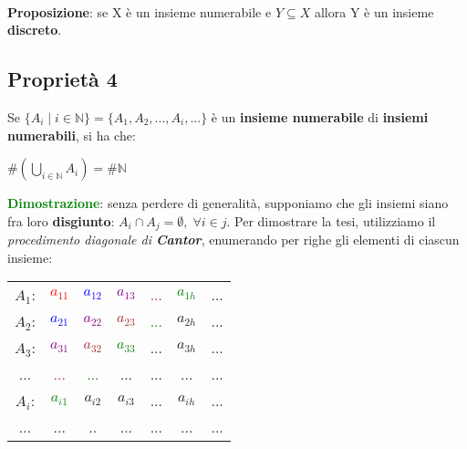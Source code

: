 \\ \newline
\textbf{Proposizione}: se X è un insieme numerabile e $Y \subseteq X$ allora Y è un insieme \textbf{discreto}.

\newpage
\subsection{Proprietà 4}
Se $\{A_i \; | \; i \in \mathbb{N}\} = \{A_1, A_2, ..., A_i, ...\}$ è un \textbf{insieme numerabile} di \textbf{insiemi numerabili}, si ha che:
\begin{center}
    $\#(\bigcup_{i \in \mathbb{N}}A_i) = \#\mathbb{N}$
\end{center}
\textcolor{green}{\textbf{Dimostrazione}}: senza perdere di generalità, supponiamo che gli insiemi siano fra loro \textbf{disgiunto}: $A_i \cap A_j = \emptyset, \; \forall i \in j$. Per dimostrare la tesi, utilizziamo il \textit{procedimento diagonale di \textbf{Cantor}}, enumerando per righe gli elementi di ciascun insieme:

\begin{center}
    \begin{tabular}{ccccccc}
        $A_1$: & \textcolor{red}{$a_{11}$} & \textcolor{blue}{$a_{12}$} & \textcolor{purple}{$a_{13}$} & \textcolor{brown}{...} & \textcolor{green}{$a_{1h}$} & ... \\
        $A_2$: & \textcolor{blue}{$a_{21}$} & \textcolor{purple}{$a_{22}$} & \textcolor{brown}{$a_{23}$} & \textcolor{green}{...} & $a_{2h}$ & ... \\
        $A_3$: & \textcolor{purple}{$a_{31}$} & \textcolor{brown}{$a_{32}$} & \textcolor{green}{$a_{33}$} & ... & $a_{3h}$ & ... \\
        ... & \textcolor{brown}{...} & \textcolor{green}{...} & ... & ... & ... & ... \\
        $A_i$: & \textcolor{green}{$a_{i1}$} & $a_{i2}$ & $a_{i3}$ & ... & $a_{ih}$ & ... \\
        ... & ... & .. & ... & ... & ... & ... \\
    \end{tabular}
\end{center}

